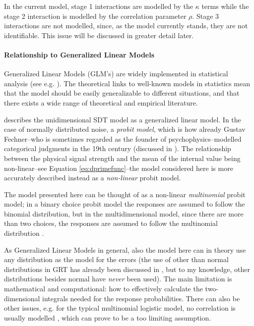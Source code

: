 \documentclass{article}\usepackage{knitr}
\begin{document}
In the current model, stage 1 interactions are modelled by the $\kappa$ terms while the stage 2 interaction is modelled by the correlation parameter $\rho$. Stage 3 interactions are not modelled, since, as the model currently stands, they are not identifiable. This issue will be discussed in greater detail later. 

\paragraph{Relationship to Generalized Linear Models}

Generalized Linear Models (GLM's) are widely implemented in statistical analysis (see e.g. \citet{kruschke2015, skrondahl2004}). The theoretical links to well-known models in statistics mean that the model should be easily generalizable to different situations, and that there exists a wide range of theoretical and empirical literature. 
 
\cite{decarlo1998} describes the unidimensional SDT model as a generalized linear model. In the case of normally distributed noise, a \textit{probit model}, which is how already Gustav Fechner--who is sometimes regarded as the founder of psychophysics--modelled categorical judgments in the 19th century (discussed in \citealt[Chapter 7]{stigler2003}). The relationship between the physical signal strength and the mean of the internal value being non-linear--see Equation \ref{eq:dprimefunc}--the model considered here is more accurately described instead as a \textit{non-linear} \citep[p. 379]{box2005} probit model. 

The model presented here can be thought of as a non-linear \textit{multinomial} probit model; in a binary choice probit model the responses are assumed to follow the binomial distribution, but in the multidimensional model, since there are more than two choices, the responses are assumed to follow the multinomial distribution \cite[p. ERROR]{skrondahl2004}. 

As Generalized Linear Models in general, also the model here can in theory use any distribution as the model for the errors (the use of other than normal distributions in GRT has already been discussed in \citet{ashby1986}, but to my knowledge, other distributions besides normal have \textit{never} been used). The main limitation is mathematical and computational: how to effectively calculate the two-dimensional integrals needed for the response probabilities. There can also be other issues, e.g. for the  typical multinomial logistic model, no correlation is usually modelled \citep{skrondahl2004}, which can prove to be a too limiting assumption.
\end{document}

